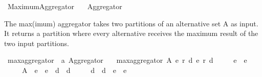 %
\begin{isabellebody}%
%
%
\isadelimdocument
\isanewline
%
\endisadelimdocument
%
\isatagdocument
\isanewline
\isanewline
%
\isamarkuptrue%
%
\endisatagdocument
{\isafolddocument}%
%
\isadelimdocument
%
\endisadelimdocument
%
\isadelimtheory
%
\endisadelimtheory
%
\isatagtheory
{}\isamarkupfalse%
\ Maximum{\isacharunderscore}{\kern0pt}Aggregator\isanewline
\ \ \ Aggregator\isanewline
{}%
\endisatagtheory
{\isafoldtheory}%
%
\isadelimtheory
%
\endisadelimtheory
%
\begin{isamarkuptext}%
The max(imum) aggregator takes two partitions of an alternative set A as
input. It returns a partition where every alternative receives the maximum
result of the two input partitions.%
\end{isamarkuptext}\isamarkuptrue%
%
\isadelimdocument
%
\endisadelimdocument
%
\isatagdocument
%
\isamarkuptrue%
%
\endisatagdocument
{\isafolddocument}%
%
\isadelimdocument
%
\endisadelimdocument
{}\isamarkupfalse%
\ max{\isacharunderscore}{\kern0pt}aggregator\ {\isacharcolon}{\kern0pt}{\isacharcolon}{\kern0pt}\ {\isachardoublequoteopen}{\isacharprime}{\kern0pt}a\ Aggregator{\isachardoublequoteclose}\ \isanewline
\ \ {\isachardoublequoteopen}max{\isacharunderscore}{\kern0pt}aggregator\ A\ {\isacharparenleft}{\kern0pt}e{}{\isacharcomma}{\kern0pt}\ r{}{\isacharcomma}{\kern0pt}\ d{}{\isacharparenright}{\kern0pt}\ {\isacharparenleft}{\kern0pt}e{}{\isacharcomma}{\kern0pt}\ r{}{\isacharcomma}{\kern0pt}\ d{}{\isacharparenright}{\kern0pt}\ {\isacharequal}{\kern0pt}\isanewline
\ \ \ \ {\isacharparenleft}{\kern0pt}e{}\ {\isasymunion}\ e{}{\isacharcomma}{\kern0pt}\isanewline
\ \ \ \ \ A\ {\isacharminus}{\kern0pt}\ {\isacharparenleft}{\kern0pt}e{}\ {\isasymunion}\ e{}\ {\isasymunion}\ d{}\ {\isasymunion}\ d{}{\isacharparenright}{\kern0pt}{\isacharcomma}{\kern0pt}\isanewline
\ \ \ \ \ {\isacharparenleft}{\kern0pt}d{}\ {\isasymunion}\ d{}{\isacharparenright}{\kern0pt}\ {\isacharminus}{\kern0pt}\ {\isacharparenleft}{\kern0pt}e{}\ {\isasymunion}\ e{}{\isacharparenright}{\kern0pt}{\isacharparenright}{\kern0pt}{\isachardoublequoteclose}%
\isadelimdocument
%
\endisadelimdocument

\end{isabellebody}
